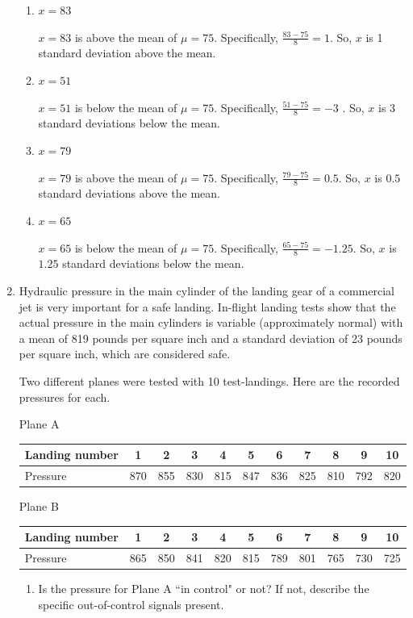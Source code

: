 \documentclass{article}
\newcommand{\answer}[1]{\color{red}#1}
\begin{document}
\begin{enumerate}
	\begin{enumerate}
	\item $x=83$ 
	
	{\answer $x=83$ is above the mean of $\mu = 75$.  Specifically, $\frac{83-75}{8} = 1$.  So, $x$ is 1 standard deviation above the mean.}
	\item $x=51$ 
	
	{\answer $x=51$ is below the mean of $\mu = 75$.  Specifically, $\frac{51-75}{8} = -3$ .  So, $x$ is 3 standard deviations below the mean.}
	\item $x=79$ 
	
	{\answer $x=79$ is above the mean of $\mu = 75$.  Specifically, $\frac{79-75}{8} = 0.5$.  So, $x$ is $0.5$ standard deviations above the mean.}
	\item $x=65$ 
	
	{\answer $x=65$ is below the mean of $\mu = 75$.  Specifically, $\frac{65-75}{8} = -1.25$.  So, $x$ is $1.25$ standard deviations below the mean.}
	\end{enumerate}

\item Hydraulic pressure in the main cylinder of the landing gear of a commercial jet is very important for a safe landing.  In-flight landing tests show that the actual pressure in the main cylinders is variable (approximately normal) with a mean of 819 pounds per square inch and a standard deviation of 23 pounds per square inch, which are considered safe.

Two different planes were tested with 10 test-landings.  Here are the recorded pressures for each. 

Plane A 

\begin{tabular}{l|cccccccccc}
\hline 
Landing number  & 1& 2 & 3 & 4 & 5 & 6 & 7 & 8 & 9 & 10 \\
\hline
Pressure & 870 & 855 & 830 & 815 & 847 & 836 & 825 & 810 & 792 & 820 \\
\hline
\end{tabular}

Plane B 

\begin{tabular}{l|cccccccccc}
\hline 
Landing number  & 1& 2 & 3 & 4 & 5 & 6 & 7 & 8 & 9 & 10 \\
\hline
Pressure & 865 & 850 & 841 & 820 & 815 & 789 & 801 & 765 & 730 & 725 \\
\hline
\end{tabular}

	\begin{enumerate}
	\item  Is the pressure for Plane A ``in control" or not?  If not, describe the specific out-of-control signals present. 
	

\end{enumerate}
\end{enumerate}
\end{document}

